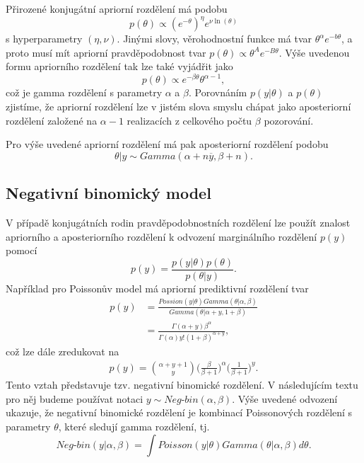 Přirozené konjugátní apriorní rozdělení má podobu
\begin{equation}
p(\theta) \varpropto (e^{-\theta})^{\eta} e^{\nu \ln(\theta)}
\end{equation}
s hyperparametry $(\eta, \nu)$. Jinými slovy, věrohodnostní funkce má tvar $\theta^{\alpha} e^{-b \theta}$, a proto musí mít apriorní pravděpodobnost tvar $p(\theta) \varpropto \theta^A e^{-B \theta}$. Výše uvedenou formu apriorního rozdělení tak lze také vyjádřit jako
\begin{equation}
p(\theta) \varpropto e^{-\beta \theta} \theta^{\alpha - 1},
\end{equation}
což je gamma rozdělení s parametry $\alpha$ a $\beta$. Porovnáním $p(y | \theta)$ a $p(\theta)$ zjistíme, že apriorní rozdělení lze v jistém slova smyslu chápat jako aposteriorní rozdělení založené na $\alpha - 1$ realizacích z celkového počtu $\beta$ pozorování.

Pro výše uvedené apriorní rozdělení má pak aposteriorní rozdělení podobu
\begin{equation}
\theta | y \sim \textit{Gamma}(\alpha + n\overline{y}, \beta + n).
\end{equation}

\subsection{Negativní binomický model}

V případě konjugátních rodin pravděpodobnostních rozdělení lze použít znalost apriorního a aposteriorního rozdělení k odvození marginálního rozdělení $p(y)$ pomocí
\begin{equation}
p(y) = \frac{p(y | \theta) p(\theta)}{p(\theta | y)}.
\end{equation}
Například pro Poissonův model má apriorní prediktivní rozdělení tvar
\begin{equation}
\begin{split}
p(y) & = \frac{\textit{Possion}(y | \theta) \textit{Gamma}(\theta | \alpha, \beta)}{\textit{Gamma}(\theta | \alpha + y, 1 + \beta)}\\
 & = \frac{\Gamma(\alpha + y)\beta^{\alpha}}{\Gamma(\alpha) y! (1 + \beta)^{\alpha + y}},
\end{split}
\end{equation}
což lze dále zredukovat na
\begin{equation}
\begin{split}
p(y) = {{\alpha + y + 1} \choose y} \Big(\frac{\beta}{\beta + 1}\Big)^{\alpha} \Big(\frac{1}{\beta + 1}\Big)^y.
\end{split}
\end{equation}
Tento vztah představuje tzv. negativní binomické rozdělení. V následujícím textu pro něj budeme používat notaci $y \sim \textit{Neg-bin}(\alpha, \beta)$. Výše uvedené odvození ukazuje, že negativní binomické rozdělení je kombinací Poissonových rozdělení s parametry $\theta$, které sledují gamma rozdělení, tj.
\begin{equation}
\textit{Neg-bin}(y | \alpha, \beta) = \int \textit{Poisson}(y | \theta) \textit{Gamma}(\theta | \alpha, \beta) d \theta.
\end{equation}

